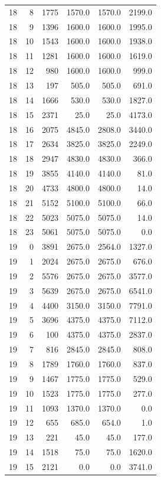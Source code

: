 \begin{longtable}{rrrrrr}
18 & 8 & 1775 & 1570.0 & 1570.0 & 2199.0\\
18 & 9 & 1396 & 1600.0 & 1600.0 & 1995.0\\
18 & 10 & 1543 & 1600.0 & 1600.0 & 1938.0\\
18 & 11 & 1281 & 1600.0 & 1600.0 & 1619.0\\
18 & 12 & 980 & 1600.0 & 1600.0 & 999.0\\
18 & 13 & 197 & 505.0 & 505.0 & 691.0\\
18 & 14 & 1666 & 530.0 & 530.0 & 1827.0\\
18 & 15 & 2371 & 25.0 & 25.0 & 4173.0\\
18 & 16 & 2075 & 4845.0 & 2808.0 & 3440.0\\
18 & 17 & 2634 & 3825.0 & 3825.0 & 2249.0\\
18 & 18 & 2947 & 4830.0 & 4830.0 & 366.0\\
18 & 19 & 3855 & 4140.0 & 4140.0 & 81.0\\
18 & 20 & 4733 & 4800.0 & 4800.0 & 14.0\\
18 & 21 & 5152 & 5100.0 & 5100.0 & 66.0\\
18 & 22 & 5023 & 5075.0 & 5075.0 & 14.0\\
18 & 23 & 5061 & 5075.0 & 5075.0 & 0.0\\
19 & 0 & 3891 & 2675.0 & 2564.0 & 1327.0\\
19 & 1 & 2024 & 2675.0 & 2675.0 & 676.0\\
19 & 2 & 5576 & 2675.0 & 2675.0 & 3577.0\\
19 & 3 & 5639 & 2675.0 & 2675.0 & 6541.0\\
19 & 4 & 4400 & 3150.0 & 3150.0 & 7791.0\\
19 & 5 & 3696 & 4375.0 & 4375.0 & 7112.0\\
19 & 6 & 100 & 4375.0 & 4375.0 & 2837.0\\
19 & 7 & 816 & 2845.0 & 2845.0 & 808.0\\
19 & 8 & 1789 & 1760.0 & 1760.0 & 837.0\\
19 & 9 & 1467 & 1775.0 & 1775.0 & 529.0\\
19 & 10 & 1523 & 1775.0 & 1775.0 & 277.0\\
19 & 11 & 1093 & 1370.0 & 1370.0 & 0.0\\
19 & 12 & 655 & 685.0 & 654.0 & 1.0\\
19 & 13 & 221 & 45.0 & 45.0 & 177.0\\
19 & 14 & 1518 & 75.0 & 75.0 & 1620.0\\
19 & 15 & 2121 & 0.0 & 0.0 & 3741.0\\

\end{longtable}
